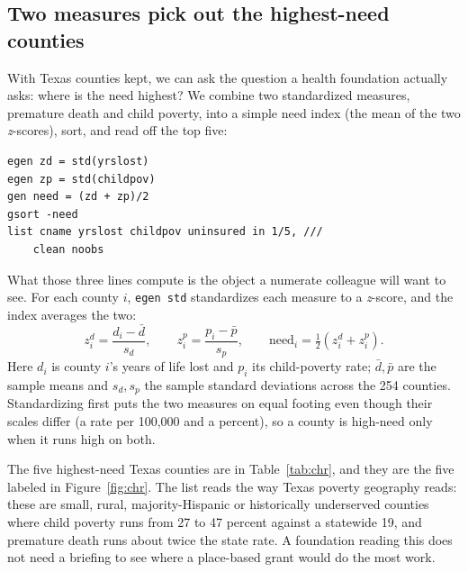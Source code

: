 \subsection{Two measures pick out the highest-need counties}\label{sec:ch04-needindex}
With Texas counties kept, we can ask the question a health foundation actually asks: where is the need highest? We combine two standardized measures, premature death and child poverty, into a simple need index (the mean of the two \emph{z}-scores), sort, and read off the top five:
\par
{\footnotesize
\begin{verbatim}
egen zd = std(yrslost)
egen zp = std(childpov)
gen need = (zd + zp)/2
gsort -need
list cname yrslost childpov uninsured in 1/5, ///
    clean noobs
\end{verbatim}
}
What those three lines compute is the object a numerate colleague will
want to see. For each county $i$, \texttt{egen std} standardizes each
measure to a \emph{z}-score, and the index averages the two:
\[
z^{d}_i=\frac{d_i-\bar d}{s_d},\qquad
z^{p}_i=\frac{p_i-\bar p}{s_p},\qquad
\text{need}_i=\tfrac{1}{2}\!\left(z^{d}_i+z^{p}_i\right).
\]
Here $d_i$ is county $i$'s years of life lost and $p_i$ its child-poverty
rate; $\bar d,\bar p$ are the sample means and $s_d,s_p$ the sample
standard deviations across the 254 counties. Standardizing first puts the two
measures on equal footing even though their scales differ (a rate per
100{,}000 and a percent), so a county is high-need only when it runs
high on both.

The five highest-need Texas counties are in Table~\ref{tab:chr}, and they are the five labeled in Figure~\ref{fig:chr}. The list reads the way Texas poverty geography reads: these are small, rural, majority-Hispanic or historically underserved counties where child poverty runs from 27 to 47 percent against a statewide 19, and premature death runs about twice the state rate. A foundation reading this does not need a briefing to see where a place-based grant would do the most work.

